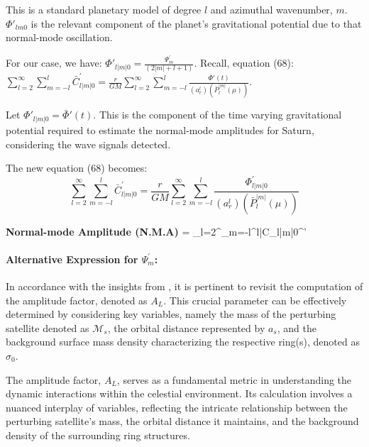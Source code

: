 \documentclass{article}
\begin{document}
This is a standard planetary model of degree $l$ and azimuthal wavenumber, $m$. $\Phi{'}_{lm0}$ is the relevant component of the planet’s gravitational potential due to that normal-mode oscillation. 

For our case, we have: $\Phi{'}_{l|m|0} = \frac{\Psi^{'}_{m}}{(2|m| + l + 1)}$. Recall, equation (68): $\sum_{l=2}^{\infty}\sum_{m=-l}^{l}\bar{C}_{l|m|0}^{'} =\frac{r}{GM} \sum_{l=2}^{\infty}\sum_{m=-l}^{l}\frac{\bar{\Phi}{'}(t)}{(a_{r}^{l})(\bar{P}_{l}^{|m|}(\mu))}$. 

Let $\Phi{'}_{l|m|0} = \bar{\Phi}{'}(t)$. This is the component of the time varying gravitational potential required to estimate the normal-mode amplitudes for Saturn, considering the wave signals detected. 

The new equation (68) becomes: 
\begin{equation}
    \sum_{l=2}^{\infty}\sum_{m=-l}^{l}\bar{C}_{l|m|0}^{'} =\frac{r}{GM} \sum_{l=2}^{\infty}\sum_{m=-l}^{l}\frac{{\Phi}^{'}_{l|m|0}}{(a_{r}^{l})(\bar{P}_{l}^{|m|}(\mu))}
\end{equation}

\textbf{Normal-mode Amplitude (N.M.A)} = \sum_{l=2}^{\infty}\sum_{m=-l}^{l}\bar{C}_{l|m|0}^{'}


\paragraph{Alternative Expression for $\Psi^{'}_{m}$:}

In accordance with the insights from \cite{Nicholson1990AnAR}, it is pertinent to revisit the computation of the amplitude factor, denoted as $A_{L}$. This crucial parameter can be effectively determined by considering key variables, namely the mass of the perturbing satellite denoted as $\mathcal{M}_{s}$, the orbital distance represented by $a_{s}$, and the background surface mass density characterizing the respective ring(s), denoted as $\sigma_{0}$.

The amplitude factor, $A_{L}$, serves as a fundamental metric in understanding the dynamic interactions within the celestial environment. Its calculation involves a nuanced interplay of variables, reflecting the intricate relationship between the perturbing satellite's mass, the orbital distance it maintains, and the background density of the surrounding ring structures.
\end{document}
